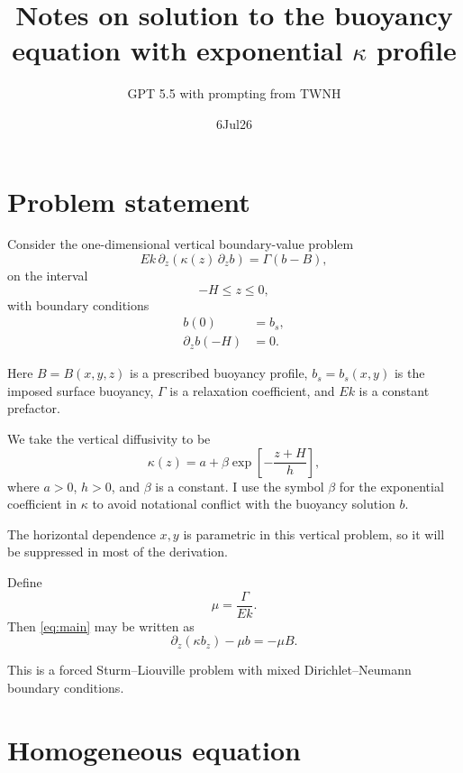 \documentclass[10pt]{amsart}
\title{Notes on solution to the buoyancy equation with exponential $\kappa$ profile}
\author{GPT 5.5 with  prompting from TWNH }
\date{6Jul26}                                           %
\begin{document}
\maketitle


\section{Problem statement}

Consider the one-dimensional vertical boundary-value problem
\begin{equation}
E k\,\partial_z\!\left(\kappa(z)\,\partial_z b\right)
=
\Gamma \left(b-B\right),
\label{eq:main}
\end{equation}
on the interval
\[
-H \le z \le 0,
\]
with boundary conditions
\begin{align}
b(0) &= b_s, \label{eq:bc_surface}\\
\partial_z b(-H) &= 0. \label{eq:bc_bottom}
\end{align}

Here \(B=B(x,y,z)\) is a prescribed buoyancy profile, \(b_s=b_s(x,y)\) is the imposed surface buoyancy, \(\Gamma\) is a relaxation coefficient, and \(E k\) is a constant prefactor.

We take the vertical diffusivity to be
\begin{equation}
\kappa(z)
=
a+\beta \exp\!\left[-\frac{z+H}{h}\right],
\label{eq:kappa}
\end{equation}
where \(a>0\), \(h>0\), and \(\beta\) is a constant. I use the symbol \(\beta\) for the exponential coefficient in \(\kappa\) to avoid notational conflict with the buoyancy solution \(b\).

The horizontal dependence \(x,y\) is parametric in this vertical problem, so it will be suppressed in most of the derivation.

Define
\begin{equation}
\mu = \frac{\Gamma}{E k}.
\label{eq:mu}
\end{equation}
Then \eqref{eq:main} may be written as
\begin{equation}
\partial_z\!\left(\kappa b_z\right)-\mu b
=
-\mu B.
\label{eq:sl_form}
\end{equation}

This is a forced Sturm--Liouville problem with mixed Dirichlet--Neumann boundary conditions.

\section{Homogeneous equation}
\end{document}
